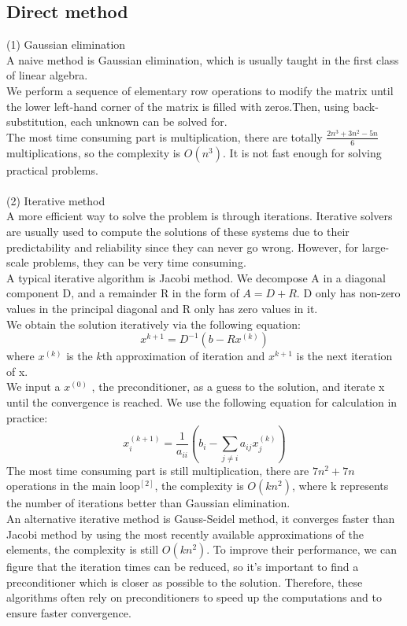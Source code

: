 \documentclass[10pt,journal]{IEEEtran}
\begin{document}
\subsection{Direct method}
(1) Gaussian elimination\\
A naive method is Gaussian elimination, which is usually taught in the first class of linear algebra.\\
We perform a sequence of elementary row operations to modify the matrix until the lower left-hand corner of the matrix is filled with zeros.Then, using back-substitution, each unknown can be solved for.\\
The most time consuming part is multiplication, there are totally $\frac{2n^3+3n^2-5n}{6}$ multiplications, so the complexity is $O(n^3)$. It is not fast enough for solving practical problems.\\\\
(2) Iterative method\\
A more efficient way to solve the problem is through iterations. Iterative solvers are usually used to compute the solutions of these systems due to their predictability and reliability since they can never go wrong. However, for large-scale problems, they can be very time consuming.\\
A typical iterative algorithm is Jacobi method. 
We decompose A in a diagonal component D, and a remainder R in the form of $A=D+R$. D only has non-zero values in the principal diagonal and R only has zero values in it.\\
We obtain the solution iteratively via the following equation:
\[x^{k+1}=D^{-1}(b-Rx^{(k)})\]
where $x^{(k)}$ is the $k$th approximation of iteration and $x^{k+1}$ is the next iteration of x.\\
We input a $x^{(0)}$ , the preconditioner, as a guess to the solution, and iterate x until the convergence is reached. We use the following equation for calculation in practice:
\[x_i^{(k+1)}=\frac{1}{a_{ii}}(b_i-\sum_{j\neq i}a_{ij}x_j^{(k)})\]
The most time consuming part is still multiplication, there are $7n^2+7n$ operations in the main loop$^{[2]}$, the complexity is $O(kn^2)$, where k represents the number of iterations better than Gaussian elimination.\\
An alternative iterative method is Gauss-Seidel method, it converges faster than Jacobi method by using the most recently available approximations of the elements, the complexity is still $O(kn^2)$. To improve their performance, we can figure that the iteration times can be reduced, so it's important to find a preconditioner which is closer as possible to the solution.
Therefore, these algorithms often rely on preconditioners to speed up the computations and to ensure faster convergence.\\\\
\end{document}
